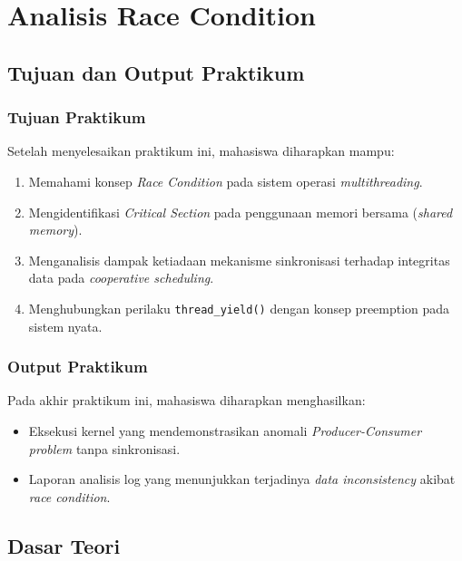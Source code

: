 
\chapter{Analisis Race Condition}
\label{chap:modul-09}

\section{Tujuan dan Output Praktikum}

\subsection{Tujuan Praktikum}
Setelah menyelesaikan praktikum ini, mahasiswa diharapkan mampu:
\begin{enumerate}
	\item Memahami konsep \textit{Race Condition} pada sistem operasi \textit{multithreading}.
	\item Mengidentifikasi \textit{Critical Section} pada penggunaan memori bersama (\textit{shared memory}).
	\item Menganalisis dampak ketiadaan mekanisme sinkronisasi terhadap integritas data pada \textit{cooperative scheduling}.
	\item Menghubungkan perilaku \texttt{thread\_yield()} dengan konsep preemption pada sistem nyata.
\end{enumerate}

\subsection{Output Praktikum}
Pada akhir praktikum ini, mahasiswa diharapkan menghasilkan:
\begin{itemize}
	\item Eksekusi kernel yang mendemonstrasikan anomali \textit{Producer-Consumer problem} tanpa sinkronisasi.
	\item Laporan analisis log yang menunjukkan terjadinya \textit{data inconsistency} akibat \textit{race condition}.
\end{itemize}


\newpage
\section{Dasar Teori}

